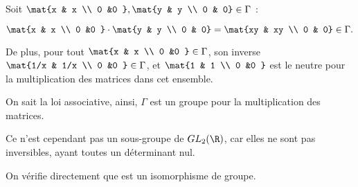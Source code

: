 Soit $\mat{x & x \\ 0 &0 }, \mat{y & y \\ 0 & 0} \in \Gamma $ :

\[\mat{x & x \\ 0 &0 } \cdot \mat{y & y \\ 0 & 0} = \mat{xy & xy \\ 0 & 0} \in \Gamma.\]

De plus, pour tout $\mat{x & x \\ 0 &0 } \in \Gamma$, son inverse $\mat{1/x & 1/x \\ 0 &0 } \in \Gamma$,  et $\mat{1 & 1 \\ 0 &0 }$ est le neutre pour la multiplication des matrices dans cet ensemble.

On sait la loi associative, ainsi, $\Gamma$ est un groupe pour la multiplication des matrices.

Ce n'est cependant pas un sous-groupe de $GL_2(\R)$, car elles ne sont pas inversibles, ayant toutes un déterminant nul.


On vérifie directement que  est un isomorphisme de groupe.